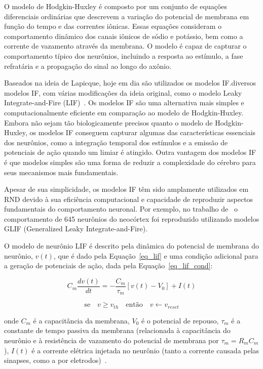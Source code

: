 O modelo de Hodgkin-Huxley é composto por um conjunto de equações diferenciais ordinárias que descrevem a variação do potencial de
membrana em função do tempo e das correntes iônicas. Essas equações consideram o comportamento dinâmico dos canais iônicos de
sódio e potássio, bem como a corrente de vazamento através da membrana. O modelo é capaz de capturar o comportamento típico dos
neurônios, incluindo a resposta ao estímulo, a fase refratária e a propagação do sinal ao longo do axônio.

Baseados na ideia de Lapicque, hoje em dia são utilizados os modelos IF.\@Existem diversos modelos IF, com
várias modificações da ideia original, como o modelo Leaky Integrate-and-Fire (LIF)~\cite{burkittReview2006}. Os modelos IF são
uma alternativa mais simples e computacionalmente eficiente em comparação ao modelo de Hodgkin-Huxley. Embora não sejam tão
biologicamente precisos quanto o modelo de Hodgkin-Huxley, os modelos IF conseguem capturar algumas das características essenciais
dos neurônios, como a integração temporal dos estímulos e a emissão de potenciais de ação quando um limiar é atingido. Outra
vantagem dos modelos IF é que modelos simples são uma forma de reduzir a complexidade do cérebro para seus mecanismos mais
fundamentais.

Apesar de sua simplicidade, os modelos IF têm sido amplamente utilizados em RND devido à sua eficiência computacional e capacidade
de reproduzir aspectos fundamentais do comportamento neuronal. Por exemplo, no trabalho de~\cite{teeterGeneralized2018} o
comportamento de 645 neurônios do neocórtex foi reproduzido utilizando modelos GLIF (Generalized Leaky Integrate-and-Fire). 

O modelo de neurônio LIF é descrito pela dinâmica do potencial de membrana do neurônio, $v(t)$, que é dado pela
Equação~\ref{eq_lif} e uma condição adicional para a geração de potenciais de ação, dada pela Equação~\ref{eq_lif_cond}:

\begin{equation}
\label{eq_lif}
C_m \frac{dv(t)}{dt} = -\frac{C_m}{\tau_m} [v(t) - V_0] + I(t)
\end{equation}

\begin{equation}
\label{eq_lif_cond}
\text{se}\quad v \ge v_{th} \quad \text{então} \quad v \gets v_{reset}
\end{equation}

onde $C_m$ é a capacitância da membrana, $V_0$ é o potencial de repouso, $\tau_m$ é a constante de tempo passiva da membrana
(relacionada à capacitância do neurônio e à resistência de vazamento do potencial de membrana por $\tau_m = R_m C_m$), $I(t)$ é a
corrente elétrica injetada no neurônio (tanto a corrente causada pelas sinapses, como a por eletrodos)~\cite{burkittReview2006}. 

